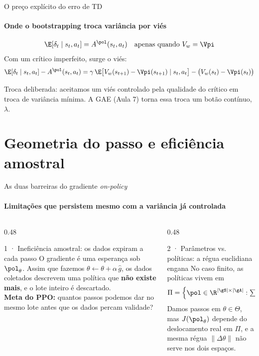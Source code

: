 \documentclass[aspectratio=169, 11pt]{beamer}
\newcommand{\ghat}{\hat{g}}
\begin{document}
\begin{frame}{O preço explícito do erro de TD}
  \framesubtitle{Onde o bootstrapping troca variância por viés}

  \begin{alertabox}[title={O erro de TD só é não-viesado com o crítico exato}]
    \[
      \E[\delta_t\mid s_t,a_t] = A^{\pol}(s_t,a_t)\quad\text{apenas quando } V_w = \Vpi
    \]
    Com um crítico imperfeito, surge o viés:
    \[
      \E[\delta_t\mid s_t,a_t] - A^{\pol}(s_t,a_t) = \gamma\,\E\big[V_w(s_{t+1}) - \Vpi(s_{t+1})\mid s_t,a_t\big]
        - \big(V_w(s_t)-\Vpi(s_t)\big)
    \]
  \end{alertabox}

  \begin{ideiabox}
    Troca deliberada: aceitamos um viés controlado pela qualidade do crítico em troca de
    variância mínima. A GAE (Aula 7) torna essa troca um botão contínuo, $\lambda$.
  \end{ideiabox}
\end{frame}

\section{Geometria do passo e eficiência amostral}

\begin{frame}{As duas barreiras do gradiente \emph{on-policy}}
  \framesubtitle{Limitações que persistem mesmo com a variância já controlada}

  \begin{columns}[T]
    \begin{column}{0.48\textwidth}
      \begin{teobox}{1 · Ineficiência amostral: os dados expiram a cada passo}
        \small O gradiente é uma esperança sob $\pol_\theta$. Assim que fazemos
        $\theta\leftarrow\theta+\alpha\,\ghat$, os dados coletados descrevem uma política que
        \textbf{não existe mais}, e o lote inteiro é descartado.\\[0.3em]
        \textbf{Meta do PPO:} quantos passos podemos dar no mesmo lote antes que os dados percam validade?
      \end{teobox}
    \end{column}
    \begin{column}{0.48\textwidth}
      \begin{teobox}{2 · Parâmetros vs. políticas: a régua euclidiana engana}
        \small No caso finito, as políticas vivem em
        \[
          \Pi = \Big\{\pol\in\R^{|\gS|\times|\gA|} : \textstyle\sum_a \pol(a\mid s) = 1,\ \pol\ge 0\Big\}
        \]
        Damos passos em $\theta\in\Theta$, mas $J(\pol_\theta)$ depende do deslocamento real em
        $\Pi$, e a mesma régua $\|\Delta\theta\|$ não serve nos dois espaços.
      \end{teobox}
    \end{column}
  \end{columns}
\end{frame}
\end{document}
